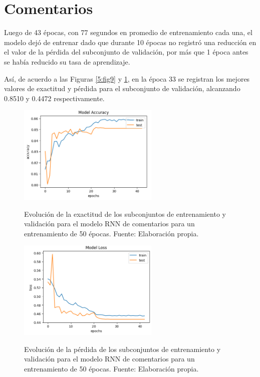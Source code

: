 \section{Comentarios}
Luego de 43 épocas, con 77 segundos en promedio de entrenamiento cada una, el modelo dejó de entrenar dado que durante 10 épocas no registró una reducción en el valor de la pérdida del subconjunto de validación, por más que 1 época antes se había reducido su tasa de aprendizaje.

Así, de acuerdo a las Figuras \ref{5:fig9} y \ref{5:fig10}, en la época 33 se registran los mejores valores de exactitud y pérdida para el subconjunto de validación, alcanzando 0.8510 y 0.4472 respectivamente.

\begin{figure}[htbp]
	\begin{center}
		\includegraphics[width=0.60\textwidth]{4/figures/comments_model_accuracy.png}
		\caption{Evolución de la exactitud de los subconjuntos de entrenamiento y validación para el modelo RNN de comentarios para un entrenamiento de 50 épocas. Fuente: Elaboración propia.}
		\label{5:fig9}
		\includegraphics[width=0.60\textwidth]{4/figures/comments_model_loss.png}
		\caption{Evolución de la pérdida de los subconjuntos de entrenamiento y validación para el modelo RNN de comentarios para un entrenamiento de 50 épocas. Fuente: Elaboración propia.}
		\label{5:fig10}
	\end{center}
\end{figure}

